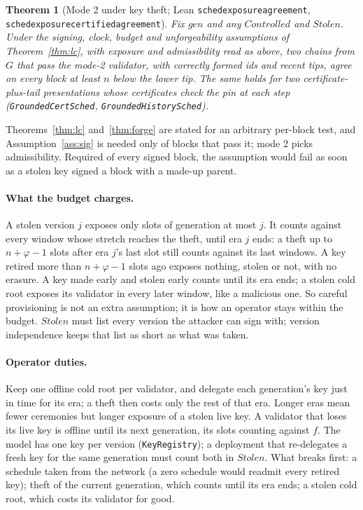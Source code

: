 \documentclass[10pt]{article}
\newtheorem{theorem}{Theorem}
\DeclareRobustCommand{\code}[1]{{\renewcommand{\_}{\textunderscore\allowbreak}\texttt{#1}}}
\newcommand{\fmax}{\ensuremath{f}}
\begin{document}
\begin{theorem}[Mode 2 under key theft; Lean
\code{sched\_exposure\_agreement},\hfil{}
\code{sched\_exposure\_certified\_agreement}]\label{thm:sched}
Fix $\mathit{gen}$ and any $\mathit{Controlled}$ and $\mathit{Stolen}$.
Under the signing, clock, budget and unforgeability assumptions of
Theorem~\ref{thm:lc}, with exposure and
admissibility read as above, two chains from $G$ that pass the mode-2
validator, with correctly formed ids and recent tips, agree on every
block at least $n$ below the lower tip. The same holds for two
certificate-plus-tail presentations whose certificates check the pin at
each step (\code{GroundedCertSched}, \code{GroundedHistorySched}).
\end{theorem}

Theorems~\ref{thm:lc} and~\ref{thm:forge} are stated for an arbitrary
per-block test, and Assumption~\ref{ass:sig} is needed only of blocks
that pass it; mode 2 picks admissibility. Required of every signed
block, the assumption would fail as soon as a stolen key signed a block
with a made-up parent.

\paragraph{What the budget charges.} A stolen version $j$ exposes only
slots of generation at most $j$. It counts against every window whose
stretch reaches the theft, until era $j$ ends: a theft up to
$n + \varphi - 1$ slots after era $j$'s last slot still counts against
its last windows. A key retired more than $n + \varphi - 1$ slots ago exposes nothing, stolen or
not, with no erasure. A key made early and stolen early counts until its
era ends; a stolen cold root exposes its validator in every later
window, like a malicious one. So careful provisioning is not an extra
assumption; it is how an operator stays within the budget.
$\mathit{Stolen}$ must list every version the attacker can sign with;
version independence keeps that list as short as what was taken.

\paragraph{Operator duties.} Keep one offline cold root per validator,
and delegate each generation's key just in time for its era; a theft then
costs only the rest of that era. Longer eras mean fewer ceremonies but
longer exposure of a stolen live key. A validator that loses its live key
is offline until its next generation, its slots counting against $\fmax$.
The model has one key per version (\code{KeyRegistry}); a deployment
that re-delegates a fresh key for the same generation must count both in
$\mathit{Stolen}$. What breaks first: a schedule taken from the network
(a zero schedule would readmit every retired key); theft of the current
generation, which counts until its era ends; a stolen cold root, which
costs its validator for good.
\end{document}
